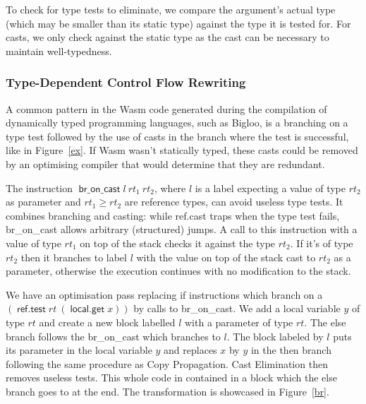 \documentclass[a4paper,11pt]{article}
\DeclareMathOperator{\broncast}{\textsf{br\_on\_cast}}
\DeclareMathOperator{\reftest}{\textsf{ref.test}}
\DeclareMathOperator{\localget}{\textsf{local.get}}
\begin{document}
To check for type tests to eliminate, we compare the argument's actual type
(which may be smaller than its static type) against the type it is tested for.
For casts, we only check against the static type as the cast can be necessary to
maintain well-typedness.

\subsubsection{Type-Dependent Control Flow Rewriting}
A common pattern in the Wasm code generated during the compilation of
dynamically typed programming languages, such as Bigloo, is a branching on a
type test followed by the use of casts in the branch where the test is
successful, like in Figure~\ref{ex}. If Wasm wasn't statically typed, these
casts could be removed by an optimising compiler that would determine that they
are redundant.

The instruction $\broncast l\ rt_1\ rt_2$, where $l$ is a label expecting a
value of type $rt_2$ as parameter and $rt_1\geq rt_2$ are reference types, can
avoid useless type tests. It combines branching and casting: while
\textsf{ref.cast} traps when the type test fails, \textsf{br\_on\_cast} allows
arbitrary (structured) jumps. A call to this instruction with a value of type
$rt_1$ on top of the stack checks it against the type $rt_2$. If it's of type
$rt_2$ then it branches to label $l$ with the value on top of the stack cast to
$rt_2$ as a parameter, otherwise the execution continues with no modification to
the stack.

We have an optimisation pass replacing \textsf{if} instructions which branch on
a $(\reftest rt\ (\localget x))$ by calls to \textsf{br\_on\_cast}. We add a
local variable $y$ of type $rt$ and create a new block labelled $l$ with a
parameter of type $rt$. The else branch follows the \textsf{br\_on\_cast} which
branches to $l$. The block labeled by $l$ puts its parameter in the local
variable $y$ and replaces $x$ by $y$ in the then branch following the same
procedure as Copy Propagation. Cast Elimination then removes useless tests. This
whole code in contained in a block which the else branch goes to at the end. The
transformation is showcased in Figure~\ref{br}.
\end{document}

